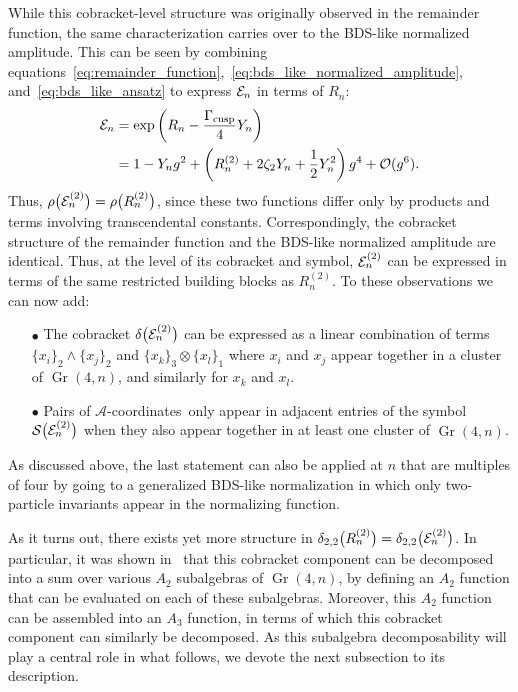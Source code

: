 \documentclass[12pt]{article}
\DeclareMathOperator{\Gr}{Gr}
\def\acoords{$\mathcal{A}$-coordinates}
\begin{document}
While this cobracket-level structure was originally observed in the remainder function, the same characterization carries over to the BDS-like normalized amplitude. This can be seen by combining equations~\eqref{eq:remainder_function},~\eqref{eq:bds_like_normalized_amplitude}, and~\eqref{eq:bds_like_ansatz} to express ${\cal E}_n$ in terms of $R_n$:
\begin{align}
{\cal E}_n &= \exp \left(R_n- \frac{\Gamma_{\text{cusp}}}{4} Y_n \right) \\
&= 1 - Y_n g^2 + \left(R_n^{(2)} + 2 \zeta_2 Y_n + \frac{1}{2} Y_n^2 \right) g^4 + \mathcal{O}(g^6). \nonumber
\end{align} 
Thus, $\rho \big({\cal E}_n^{(2)}\big) = \rho \big(R_n^{(2)} \big)$, since these two functions differ only by products and terms involving transcendental constants. Correspondingly, the cobracket structure of the remainder function and the BDS-like normalized amplitude are identical. Thus, at the level of its cobracket and symbol, ${\cal E}^{(2)}_n$ can be expressed in terms of the same restricted building blocks as $R^{(2)}_n$. To these observations we can now add:
\begin{itemize}
\item[$\bullet$] The cobracket $\delta\big({\cal E}^{(2)}_n\big)$ can be expressed as a linear combination of terms $\{x_i\}_2 \wedge \{x_j\}_2$ and $\{x_k\}_3 \otimes \{x_l \}_1$ where $x_i$ and $x_j$ appear together in a cluster of $\Gr(4,n)$, and similarly for $x_k$ and $x_l$. 
\item[$\bullet$] Pairs of \acoords\ only appear in adjacent entries of the symbol ${\cal S} \big({\cal E}^{(2)}_n\big)$ when they also appear together in at least one cluster of $\Gr(4,n)$.
\end{itemize}
As discussed above, the last statement can also be applied at $n$ that are multiples of four by going to a generalized BDS-like normalization in which only two-particle invariants appear in the normalizing function.

As it turns out, there exists yet more structure in $\delta_{2,2}\big(R^{(2)}_n\big) = \delta_{2,2}\big({\cal E}^{(2)}_n\big)$. In particular, it was shown in~\cite{Golden:2014xqa} that this cobracket component can be decomposed into a sum over various $A_2$ subalgebras of $\Gr(4,n)$, by defining an $A_2$ function that can be evaluated on each of these subalgebras. Moreover, this $A_2$ function can be assembled into an $A_3$ function, in terms of which this cobracket component can similarly be decomposed. As this subalgebra decomposability will play a central role in what follows, we devote the next subsection to its description.
\end{document}

